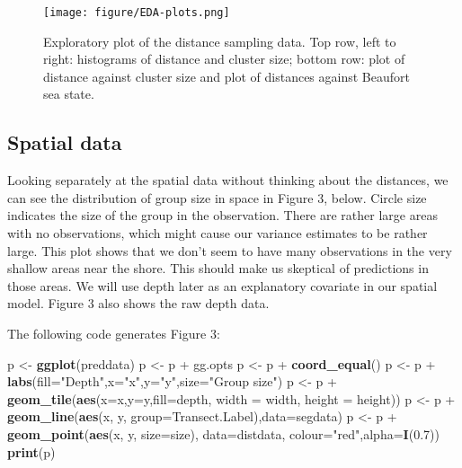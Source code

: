 \documentclass[]{article}
\newenvironment{Shaded}{}{}
\newcommand{\KeywordTok}[1]{\textcolor[rgb]{0.00,0.44,0.13}{\textbf{{#1}}}}
\newcommand{\DataTypeTok}[1]{\textcolor[rgb]{0.56,0.13,0.00}{{#1}}}
\newcommand{\FloatTok}[1]{\textcolor[rgb]{0.25,0.63,0.44}{{#1}}}
\newcommand{\StringTok}[1]{\textcolor[rgb]{0.25,0.44,0.63}{{#1}}}
\newcommand{\NormalTok}[1]{{#1}}
\begin{document}
\begin{figure}[htbp]
\centering
\texttt{[image: figure/EDA-plots.png]}
\caption{Exploratory plot of the distance sampling data. Top row, left
to right: histograms of distance and cluster size; bottom row: plot of
distance against cluster size and plot of distances against Beaufort sea
state.}
\end{figure}

\subsection{Spatial data}\label{spatial-data}

Looking separately at the spatial data without thinking about the
distances, we can see the distribution of group size in space in Figure
3, below. Circle size indicates the size of the group in the
observation. There are rather large areas with no observations, which
might cause our variance estimates to be rather large. This plot shows
that we don't seem to have many observations in the very shallow areas
near the shore. This should make us skeptical of predictions in those
areas. We will use depth later as an explanatory covariate in our
spatial model. Figure 3 also shows the raw depth data.

The following code generates Figure 3:

\begin{Shaded}
\begin{Highlighting}[]
\NormalTok{p <-}\StringTok{ }\KeywordTok{ggplot}\NormalTok{(preddata)}
\NormalTok{p <-}\StringTok{ }\NormalTok{p +}\StringTok{ }\NormalTok{gg.opts}
\NormalTok{p <-}\StringTok{ }\NormalTok{p +}\StringTok{ }\KeywordTok{coord_equal}\NormalTok{()}
\NormalTok{p <-}\StringTok{ }\NormalTok{p +}\StringTok{ }\KeywordTok{labs}\NormalTok{(}\DataTypeTok{fill=}\StringTok{"Depth"}\NormalTok{,}\DataTypeTok{x=}\StringTok{"x"}\NormalTok{,}\DataTypeTok{y=}\StringTok{"y"}\NormalTok{,}\DataTypeTok{size=}\StringTok{"Group size"}\NormalTok{)}
\NormalTok{p <-}\StringTok{ }\NormalTok{p +}\StringTok{ }\KeywordTok{geom_tile}\NormalTok{(}\KeywordTok{aes}\NormalTok{(}\DataTypeTok{x=}\NormalTok{x,}\DataTypeTok{y=}\NormalTok{y,}\DataTypeTok{fill=}\NormalTok{depth, }\DataTypeTok{width =} \NormalTok{width, }\DataTypeTok{height =} \NormalTok{height))}
\NormalTok{p <-}\StringTok{ }\NormalTok{p +}\StringTok{ }\KeywordTok{geom_line}\NormalTok{(}\KeywordTok{aes}\NormalTok{(x, y, }\DataTypeTok{group=}\NormalTok{Transect.Label),}\DataTypeTok{data=}\NormalTok{segdata)}
\NormalTok{p <-}\StringTok{ }\NormalTok{p +}\StringTok{ }\KeywordTok{geom_point}\NormalTok{(}\KeywordTok{aes}\NormalTok{(x, y, }\DataTypeTok{size=}\NormalTok{size), }\DataTypeTok{data=}\NormalTok{distdata, }\DataTypeTok{colour=}\StringTok{"red"}\NormalTok{,}\DataTypeTok{alpha=}\KeywordTok{I}\NormalTok{(}\FloatTok{0.7}\NormalTok{))}
\KeywordTok{print}\NormalTok{(p)}
\end{Highlighting}
\end{Shaded}
\end{document}
